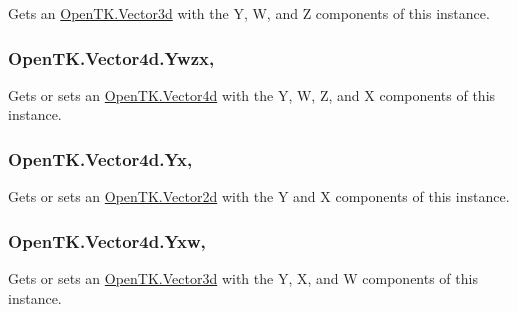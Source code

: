 Gets an \hyperlink{struct_open_t_k_1_1_vector3d}{Open\-T\-K.\-Vector3d} with the Y, W, and Z components of this instance. 

\hypertarget{struct_open_t_k_1_1_vector4d_a5af0e53a635f02c740144194401b55e8}{
\subsubsection[{Ywzx}]{ Open\-T\-K.\-Vector4d.\-Ywzx\hspace{0.3cm}{\ttfamily [get]}, {\ttfamily [set]}}}\label{struct_open_t_k_1_1_vector4d_a5af0e53a635f02c740144194401b55e8}


Gets or sets an \hyperlink{struct_open_t_k_1_1_vector4d}{Open\-T\-K.\-Vector4d} with the Y, W, Z, and X components of this instance. 

\hypertarget{struct_open_t_k_1_1_vector4d_a646a3b4894af900f5bc9e42da9609e7c}{
\subsubsection[{Yx}]{ Open\-T\-K.\-Vector4d.\-Yx\hspace{0.3cm}{\ttfamily [get]}, {\ttfamily [set]}}}\label{struct_open_t_k_1_1_vector4d_a646a3b4894af900f5bc9e42da9609e7c}


Gets or sets an \hyperlink{struct_open_t_k_1_1_vector2d}{Open\-T\-K.\-Vector2d} with the Y and X components of this instance. 

\hypertarget{struct_open_t_k_1_1_vector4d_a90b3743157ec0930db8459bb85f1e348}{
\subsubsection[{Yxw}]{ Open\-T\-K.\-Vector4d.\-Yxw\hspace{0.3cm}{\ttfamily [get]}, {\ttfamily [set]}}}\label{struct_open_t_k_1_1_vector4d_a90b3743157ec0930db8459bb85f1e348}


Gets or sets an \hyperlink{struct_open_t_k_1_1_vector3d}{Open\-T\-K.\-Vector3d} with the Y, X, and W components of this instance. 

